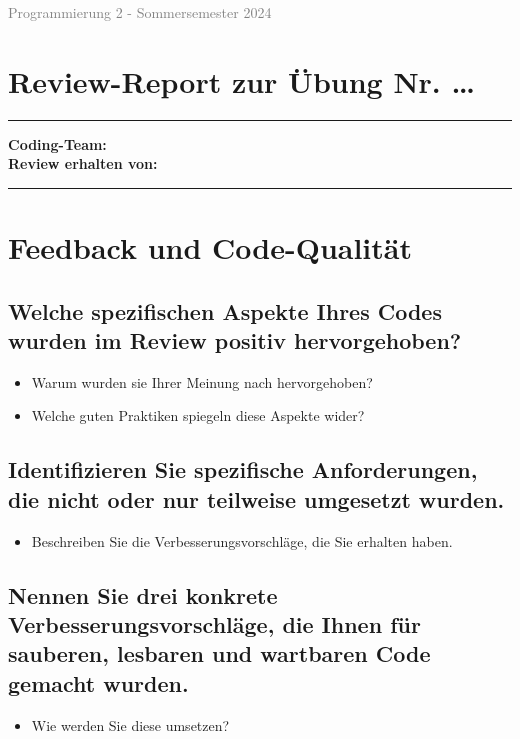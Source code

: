 \documentclass[a4paper,11pt]{article}
\newcommand{\smallgray}[1]{\textcolor{gray}{\small #1}}
\newcommand{\myrule}{\noindent\rule{\textwidth}{0.5pt}}
\begin{document}
\noindent\smallgray{Programmierung 2 - Sommersemester 2024}

\section*{\LARGE Review-Report zur Übung Nr. \dots}

\myrule

\vspace{0.5cm}

\noindent\textbf{Coding-Team:}\\
\textbf{Review erhalten von:}

\vspace{0.5cm}

\myrule

\vspace{1cm}

\section*{Feedback und Code-Qualität}

\subsection*{Welche spezifischen Aspekte Ihres Codes wurden im Review positiv hervorgehoben?}
\begin{itemize}
    \item Warum wurden sie Ihrer Meinung nach hervorgehoben?
    \item Welche guten Praktiken spiegeln diese Aspekte wider?
\end{itemize}

\subsection*{Identifizieren Sie spezifische Anforderungen, die nicht oder nur teilweise umgesetzt wurden.}
\begin{itemize}
    \item Beschreiben Sie die Verbesserungsvorschläge, die Sie erhalten haben.
\end{itemize}

\subsection*{Nennen Sie drei konkrete Verbesserungsvorschläge, die Ihnen für sauberen, lesbaren und wartbaren Code gemacht wurden.}
\begin{itemize}
    \item Wie werden Sie diese umsetzen?
\end{itemize}
\end{document}
